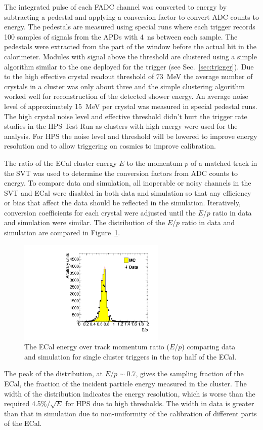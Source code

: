 \documentclass[final,3p,times,twocolumn]{elsarticle}
\begin{document}
The integrated pulse of each FADC channel was converted to energy by  
subtracting a pedestal and applying a conversion factor to convert ADC counts to energy. 
The pedestals are measured using special runs where each trigger records 100 samples of signals 
from the APDs with 4~ns between each sample. The pedestals were extracted from the 
part of the window before the actual hit in the calorimeter. Modules with signal above the threshold  
are clustered using a simple algorithm similar to the one 
deployed for the trigger (see Sec.~\ref{sec:trigger}). Due to the high effective crystal readout threshold 
of 73~MeV the average number of crystals in a cluster was only about three and the simple clustering 
algorithm worked well for reconstruction of the detected shower energy. An average noise level of 
approximately 15~MeV per crystal was measured in special pedestal runs. The high crystal noise level 
and effective threshold didn't hurt the trigger rate studies in the HPS Test Run 
as clusters with high energy were used for the analysis. For HPS the noise level and threshold will be 
lowered to improve energy resolution and to allow triggering on cosmics to improve calibration.  

The ratio of the ECal cluster energy $E$ to the momentum $p$ of a matched track in the SVT was used 
to determine the conversion factors from ADC counts to energy. To compare data and simulation, all 
inoperable or noisy channels in the SVT and ECal were disabled in both data and simulation so that 
any efficiency or bias that affect the data should be reflected in the simulation. 
Iteratively, conversion coefficients for each crystal were adjusted until the $E$/$p$ ratio in data and 
simulation were similar. The distribution of the $E$/$p$ ratio in data and simulation are compared in 
Figure~\ref{fig:gains}. 
\begin{figure}[]
\begin{center}
	\includegraphics[width=7cm]{h_ep_data_0_h_ep_MC_0_dataMC_1351-v6-v6gains_2-trig-top-cl600reg0.pdf}
	\caption{The ECal energy over track momentum ratio ($E$/$p$) comparing data and simulation 
	for single cluster triggers in the top half of the ECal.
	\label{fig:gains}}
\end{center}
\end{figure}
The peak of the distribution, at $E/p\sim0.7$, gives the sampling fraction of the ECal, the fraction of the 
incident particle energy measured in the cluster. The width of the distribution indicates the energy 
resolution, which is worse than the required 4.5\%/$\sqrt{E}$ for HPS due to high thresholds. 
The width in data is greater than that in simulation due to non-uniformity of the calibration of different parts 
of the ECal. 
\end{document}

